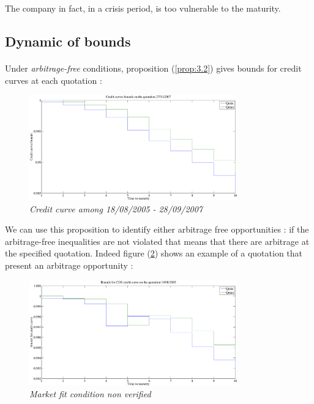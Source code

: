 The company in fact, in a crisis period, is too vulnerable to the maturity. 

\subsection{Dynamic of bounds }
\label{sec:dynamic-bounds-}

\paragraph{}
Under  \textit{arbitrage-free}  conditions, proposition  (\ref{prop:3.2})  gives
bounds for credit curves at each quotation :
\begin{figure}[H]

  \centering
  \includegraphics[width=0.8\textwidth]{cotation_27_11_2007}
  \caption{\it Credit curve among 18/08/2005 - 28/09/2007}
\label{fig7}
\end{figure}

We can  use this  proposition to
identify   either  arbitrage   free  opportunities   :  if   the  arbitrage-free
inequalities  are not  violated  that  means that  there  are  arbitrage at  the
specified quotation.  Indeed figure (\ref{fig:8}) shows an example of a quotation that
present an arbitrage opportunity :

\begin{figure}[H]
  \centering
  \includegraphics[width=0.8\textwidth]{cotation-18-08-2005}
  \caption{\it Market fit condition non verified}
  \label{fig:8}
\end{figure}


